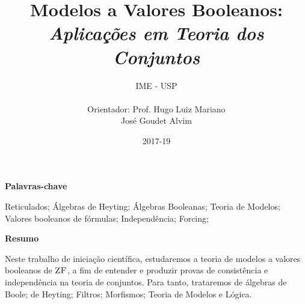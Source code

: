 \documentclass[12pt]{report}
\title{{\textbf{Modelos a Valores Booleanos:}}\\\textit{Aplicações em Teoria dos Conjuntos}}
\author{
    {\LARGE IME - USP}\\\\
    {Orientador: Prof. Hugo Luiz Mariano}\\
                    José Goudet Alvim
}
\date{2017-19}
\begin{document}
    \maketitle
    \justify
    \begin{center}{\bf Palavras-chave}\end{center}
        Reticulados; Álgebras de Heyting; Álgebras Booleanas; 
        Teoria de Modelos; Valores booleanos de fórmulas; 
        Independência; Forcing;
    \begin{center}{\bf Resumo}\end{center}
        Neste trabalho de iniciação científica, estudaremos 
        a teoria de modelos a valores booleanos de $\text{\sc{ZF}}$, 
        a fim de entender e produzir provas de consistência 
        e independência na teoria de conjuntos. Para tanto, 
        trataremos de álgebras de Boole; de Heyting; Filtros; 
        Morfismos; Teoria de Modelos e Lógica.
    \cls
    
    \tableofcontents
    \cls
    
    
\end{document}
